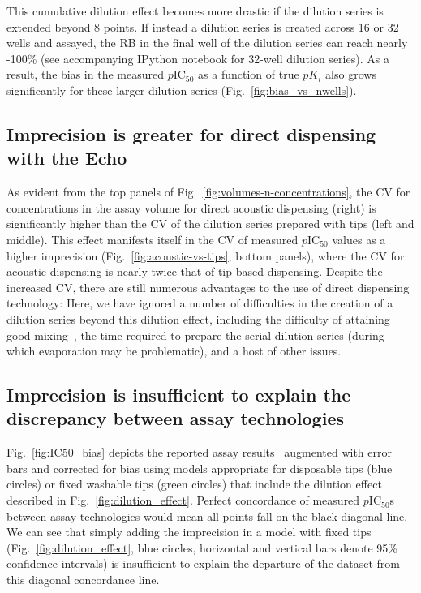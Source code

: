 \documentclass[aps,pre,twocolumn,nofootinbib,superscriptaddress,linenumbers]{revtex4-1}
\begin{document}
This cumulative dilution effect becomes more drastic if the dilution series is extended beyond 8 points.
If instead a dilution series is created across 16 or 32 wells and assayed, the RB in the final well of the dilution series can reach nearly -100\% (see accompanying IPython notebook for 32-well dilution series).
As a result, the bias in the measured $p$IC$_{50}$ as a function of true $pK_i$ also grows significantly for these larger dilution series (Fig.~\ref{fig:bias_vs_nwells}).

\subsection*{Imprecision is greater for direct dispensing with the Echo}

As evident from the top panels of Fig.~\ref{fig:volumes-n-concentrations}, the CV for concentrations in the assay volume for direct acoustic dispensing (right) is significantly higher than the CV of the dilution series prepared with tips (left and middle).
This effect manifests itself in the CV of measured $p$IC$_{50}$ values as a higher imprecision (Fig.~\ref{fig:acoustic-vs-tips}, bottom panels), where the CV for acoustic dispensing is nearly twice that of tip-based dispensing.
Despite the increased CV, there are still numerous advantages to the use of direct dispensing technology: 
Here, we have ignored a number of difficulties in the creation of a dilution series beyond this dilution effect, including the difficulty of attaining good mixing~\cite{walling_mixing_2007,weiss_modeling_2002,mitre_turbo-mixing_2007}, the time required to prepare the serial dilution series (during which evaporation may be problematic), and a host of other issues.

\subsection*{Imprecision is insufficient to explain the discrepancy between assay technologies}

Fig.~\ref{fig:IC50_bias} depicts the reported assay results~\cite{ekins_dispensing_2013,barlaam_novel_2009,barlaam_pyrimidine_2010} augmented with error bars and corrected for bias using models appropriate for disposable tips (blue circles) or fixed washable tips (green circles) that include the dilution effect described in Fig.~\ref{fig:dilution_effect}.
Perfect concordance of measured $p$IC$_{50}$s between assay technologies would mean all points fall on the black diagonal line.
We can see that simply adding the imprecision in a model with fixed tips (Fig.~\ref{fig:dilution_effect}, blue circles, horizontal and vertical bars denote 95\% confidence intervals) is insufficient to explain the departure of the dataset from this diagonal concordance line.
\end{document}
